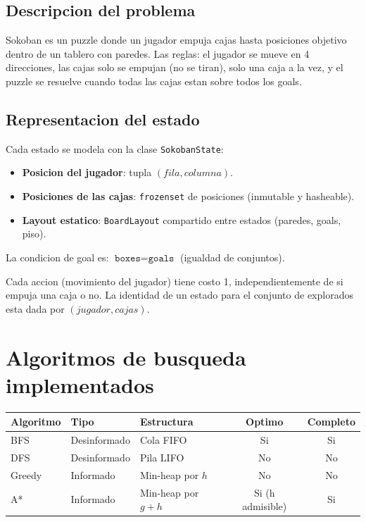 \documentclass[12pt, a4paper]{article}
\begin{document}
\subsection{Descripcion del problema}

Sokoban es un puzzle donde un jugador empuja cajas hasta posiciones objetivo dentro de un tablero con paredes. Las reglas: el jugador se mueve en 4 direcciones, las cajas solo se empujan (no se tiran), solo una caja a la vez, y el puzzle se resuelve cuando todas las cajas estan sobre todos los goals.

\subsection{Representacion del estado}

Cada estado se modela con la clase \texttt{SokobanState}:

\begin{itemize}
  \item \textbf{Posicion del jugador}: tupla $(fila, columna)$.
  \item \textbf{Posiciones de las cajas}: \texttt{frozenset} de posiciones (inmutable y hasheable).
  \item \textbf{Layout estatico}: \texttt{BoardLayout} compartido entre estados (paredes, goals, piso).
\end{itemize}

La condicion de goal es: $\texttt{boxes} = \texttt{goals}$ (igualdad de conjuntos).

Cada accion (movimiento del jugador) tiene costo 1, independientemente de si empuja una caja o no. La identidad de un estado para el conjunto de explorados esta dada por $(jugador, cajas)$.

\section{Algoritmos de busqueda implementados}

\begin{center}
\begin{tabular}{lllcc}
\toprule
\textbf{Algoritmo} & \textbf{Tipo} & \textbf{Estructura} & \textbf{Optimo} & \textbf{Completo} \\
\midrule
BFS & Desinformado & Cola FIFO & Si & Si \\
DFS & Desinformado & Pila LIFO & No & No \\
Greedy & Informado & Min-heap por $h$ & No & No \\
A* & Informado & Min-heap por $g+h$ & Si (h admisible) & Si \\
\bottomrule
\end{tabular}
\end{center}
\end{document}

